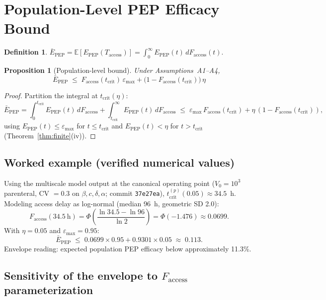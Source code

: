 \documentclass[11pt]{article}
\newtheorem{proposition}{Proposition}[section]
\theoremstyle{definition}
\newtheorem{definition}{Definition}[section]
\theoremstyle{remark}
\newcommand{\Epep}{E_{\text{PEP}}}
\newcommand{\Ebarpep}{\bar{E}_{\text{PEP}}}
\newcommand{\Faccess}{F_{\text{access}}}
\newcommand{\tcrit}{t_{\text{crit}}}
\newcommand{\emax}{\varepsilon_{\max}}
\begin{document}
\section{Population-Level PEP Efficacy Bound}

\begin{definition}
$\Ebarpep = \mathbb{E}[\Epep(T_{\text{access}})] = \int_{0}^{\infty} \Epep(t)\,d\Faccess(t)$.
\end{definition}

\begin{proposition}[Population-level bound]\label{prop:bound}
Under Assumptions~A1--A4,
\begin{equation}
\Ebarpep \;\leq\; \Faccess(\tcrit)\,\emax + \big(1 - \Faccess(\tcrit)\big)\,\eta
\label{eq:bound_si}
\end{equation}
\end{proposition}

\begin{proof}
Partition the integral at $\tcrit(\eta)$:
\[
\Ebarpep = \int_{0}^{\tcrit} \Epep(t)\,d\Faccess + \int_{\tcrit}^{\infty} \Epep(t)\,d\Faccess
\;\leq\; \emax\,\Faccess(\tcrit) + \eta\,(1 - \Faccess(\tcrit)),
\]
using $\Epep(t) \leq \emax$ for $t \leq \tcrit$ and $\Epep(t) < \eta$ for $t > \tcrit$ (Theorem~\ref{thm:finite}(iv)).
\end{proof}

\subsection{Worked example (verified numerical values)}

Using the multiscale model output at the canonical operating point ($V_{0} = 10^{3}$ parenteral, CV $= 0.3$ on $\beta, c, \delta, \alpha$; commit \texttt{37e27ea}), $\tcrit^{(p)}(0.05) \approx 34.5$~h. Modeling access delay as log-normal (median 96~h, geometric SD 2.0):
\[
\Faccess(34.5~\text{h}) = \Phi\!\left(\frac{\ln 34.5 - \ln 96}{\ln 2}\right) = \Phi(-1.476) \approx 0.0699.
\]
With $\eta = 0.05$ and $\emax = 0.95$:
\[
\Ebarpep \;\leq\; 0.0699 \times 0.95 + 0.9301 \times 0.05 \;\approx\; 0.113.
\]
Envelope reading: expected population PEP efficacy below approximately 11.3\%.

\subsection{Sensitivity of the envelope to \texorpdfstring{$\Faccess$}{Faccess} parameterization}
\end{document}
